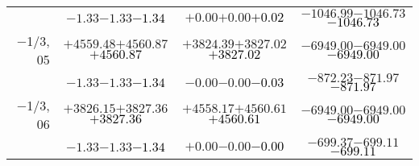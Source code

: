 \documentclass[compress]{beamer}
\begin{document}
\begin{frame}
{\begin{tabular}{r | c | c | c}
           & $-1.33$\hspace{0.1 cm}$-1.33$\hspace{0.1 cm}\textcolor{black}{$-1.34$} & $+0.00$\hspace{0.1 cm}$+0.00$\hspace{0.1 cm}\textcolor{black}{$+0.02$} & $-1046.99$\hspace{0.1 cm}$-1046.73$\hspace{0.1 cm}\textcolor{black}{$-1046.73$} \\
$-$1/3, 05 & $+4559.48$\hspace{0.1 cm}$+4560.87$\hspace{0.1 cm}\textcolor{black}{$+4560.87$} & $+3824.39$\hspace{0.1 cm}$+3827.02$\hspace{0.1 cm}\textcolor{black}{$+3827.02$} & $-6949.00$\hspace{0.1 cm}$-6949.00$\hspace{0.1 cm}\textcolor{black}{$-6949.00$} \\
           & $-1.33$\hspace{0.1 cm}$-1.33$\hspace{0.1 cm}\textcolor{black}{$-1.34$} & $-0.00$\hspace{0.1 cm}$-0.00$\hspace{0.1 cm}\textcolor{black}{$-0.03$} & $-872.23$\hspace{0.1 cm}$-871.97$\hspace{0.1 cm}\textcolor{black}{$-871.97$} \\
$-$1/3, 06 & $+3826.15$\hspace{0.1 cm}$+3827.36$\hspace{0.1 cm}\textcolor{black}{$+3827.36$} & $+4558.17$\hspace{0.1 cm}$+4560.61$\hspace{0.1 cm}\textcolor{black}{$+4560.61$} & $-6949.00$\hspace{0.1 cm}$-6949.00$\hspace{0.1 cm}\textcolor{black}{$-6949.00$} \\
           & $-1.33$\hspace{0.1 cm}$-1.33$\hspace{0.1 cm}\textcolor{black}{$-1.34$} & $+0.00$\hspace{0.1 cm}$-0.00$\hspace{0.1 cm}\textcolor{black}{$-0.00$} & $-699.37$\hspace{0.1 cm}$-699.11$\hspace{0.1 cm}\textcolor{black}{$-699.11$} \\
\end{tabular}}
\end{frame}
\end{document}
